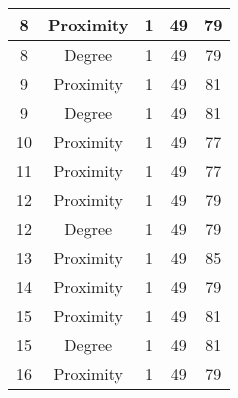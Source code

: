 \documentclass[results.tex]{subfiles}
\begin{document}
\begin{center}
\begin{tabular}{| c || c | c | c | c |}
            \hline
            8                       & Proximity                    & 1                      & 49                      & 79                   \\
            \hline
            8                       & Degree                       & 1                      & 49                      & 79                   \\
            \hline
            9                       & Proximity                    & 1                      & 49                      & 81                   \\
            \hline
            9                       & Degree                       & 1                      & 49                      & 81                   \\
            \hline
            10                      & Proximity                    & 1                      & 49                      & 77                   \\
            \hline
            11                      & Proximity                    & 1                      & 49                      & 77                   \\
            \hline
            12                      & Proximity                    & 1                      & 49                      & 79                   \\
            \hline
            12                      & Degree                       & 1                      & 49                      & 79                   \\
            \hline
            13                      & Proximity                    & 1                      & 49                      & 85                   \\
            \hline
            14                      & Proximity                    & 1                      & 49                      & 79                   \\
            \hline
            15                      & Proximity                    & 1                      & 49                      & 81                   \\
            \hline
            15                      & Degree                       & 1                      & 49                      & 81                   \\
            \hline
            16                      & Proximity                    & 1                      & 49                      & 79                   \\

\end{tabular}
\end{center}
\end{document}
